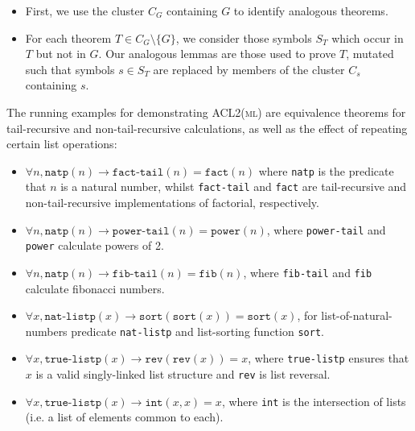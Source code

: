 \begin{itemize}
\item First, we use the cluster $C_G$ containing $G$ to identify analogous
  theorems.

\item For each theorem $T \in C_G \setminus \{G\}$, we consider those symbols
  $S_T$ which occur in $T$ but not in $G$. Our analogous lemmas are those used
  to prove $T$, mutated such that symbols $s \in S_T$ are replaced by members of
  the cluster $C_s$ containing $s$.
\end{itemize}

The running examples for demonstrating \textsc{ACL2(ml)} are equivalence
theorems for tail-recursive and non-tail-recursive calculations, as well as the
effect of repeating certain list operations:

\begin{itemize}

  \item $\forall n, \texttt{natp}(n) \rightarrow \texttt{fact-tail}(n) = \texttt{fact}(n)$ where \texttt{natp} is the predicate that $n$ is a natural number, whilst \texttt{fact-tail} and \texttt{fact} are tail-recursive and non-tail-recursive implementations of factorial, respectively.

  \item $\forall n, \texttt{natp}(n) \rightarrow \texttt{power-tail}(n) = \texttt{power}(n)$,  where \texttt{power-tail} and \texttt{power} calculate powers of 2.

  \item $\forall n, \texttt{natp}(n) \rightarrow \texttt{fib-tail}(n) = \texttt{fib}(n)$,  where \texttt{fib-tail} and \texttt{fib} calculate fibonacci numbers.

  \item $\forall x, \texttt{nat-listp}(x) \rightarrow \texttt{sort}(\texttt{sort}(x)) = \texttt{sort}(x)$, for list-of-natural-numbers predicate \texttt{nat-listp} and list-sorting function \texttt{sort}.

  \item $\forall x, \texttt{true-listp}(x) \rightarrow \texttt{rev}(\texttt{rev}(x)) = x$, where \texttt{true-listp} ensures that $x$ is a valid singly-linked list structure and \texttt{rev} is list reversal.

  \item $\forall x, \texttt{true-listp}(x) \rightarrow \texttt{int}(x, x) = x$, where \texttt{int} is the intersection of lists (i.e. a list of elements common to each).

\end{itemize}

